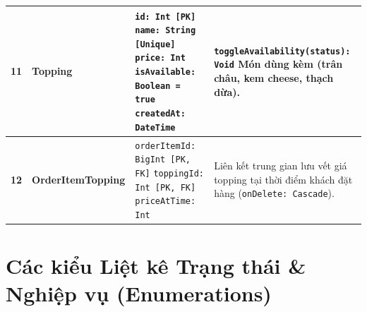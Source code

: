 \documentclass[12pt,a4paper]{article}
\begin{document}
\begin{xltabular}{\textwidth}{|c|>{\raggedright\arraybackslash}p{3.2cm}|>{\raggedright\arraybackslash}p{4.2cm}|>{\raggedright\arraybackslash}X|}
\textbf{11} & \textbf{Topping} & 
\texttt{id: Int [PK]}\newline
\texttt{name: String [Unique]}\newline
\texttt{price: Int}\newline
\texttt{isAvailable: Boolean = true}\newline
\texttt{createdAt: DateTime} & 
\texttt{toggleAvailability(status): Void}\newline
Món dùng kèm (trân châu, kem cheese, thạch dừa). \\
\hline

\textbf{12} & \textbf{OrderItemTopping} & 
\texttt{orderItemId: BigInt [PK, FK]}\newline
\texttt{toppingId: Int [PK, FK]}\newline
\texttt{priceAtTime: Int} & 
Liên kết trung gian lưu vết giá topping tại thời điểm khách đặt hàng (\texttt{onDelete: Cascade}). \\
\hline
\end{xltabular}

\section{Các kiểu Liệt kê Trạng thái \& Nghiệp vụ (Enumerations)}
\end{document}
